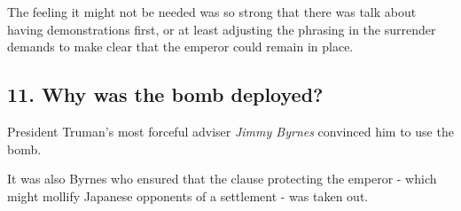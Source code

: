 The feeling it might not be needed was so strong that there was talk about having demonstrations first, or at least adjusting the phrasing in the surrender demands to make clear that the emperor could remain in place.

\subsection*{11. Why was the bomb deployed?}
President Truman's most forceful adviser \emph{Jimmy Byrnes} convinced him to use the bomb.

It was also Byrnes who ensured that the clause protecting the emperor - which might mollify Japanese opponents of a settlement - was taken out.